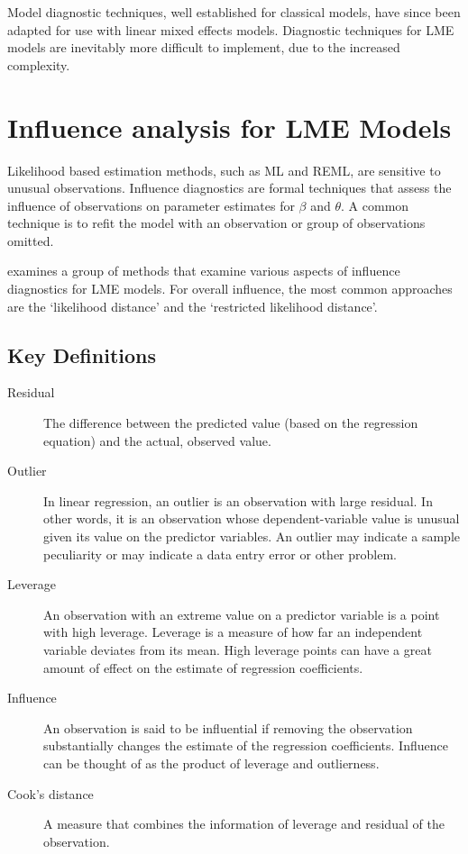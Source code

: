 \documentclass[12pt, a4paper]{article}
\begin{document}
			Model diagnostic techniques, well established for classical models, have since been adapted for use with linear mixed effects models. Diagnostic techniques for LME models are inevitably more difficult to implement, due to the increased complexity.
			
			\section{Influence analysis for LME Models} %
			
			Likelihood based estimation methods, such as ML and REML, are sensitive to unusual observations. Influence diagnostics are formal techniques that assess the influence of observations on parameter estimates for $\beta$ and $\theta$. A common technique is to refit the model with an observation or group of observations omitted.
			
			\citet{west} examines a group of methods that examine various aspects of influence diagnostics for LME models.
			For overall influence, the most common approaches are the `likelihood distance' and the `restricted likelihood distance'.	
			
			

\newpage
\subsection{Key Definitions}
\begin{description}
	\item[ Residual] The difference between the predicted value (based on the regression equation) and the actual, observed value.
	
	\item[ Outlier] In linear regression, an outlier is an observation with large residual. In other words, it is an observation whose dependent-variable value is unusual given its value on the predictor variables. An outlier may indicate a sample peculiarity or may indicate a data entry error or other problem.
	
	\item[ Leverage] An observation with an extreme value on a predictor variable is a point with high leverage. Leverage is a measure of how far an independent variable deviates from its mean. High leverage points can have a great amount of effect on the estimate of regression coefficients.
	
	\item[ Influence] An observation is said to be influential if removing the observation substantially changes the estimate of the regression coefficients.  Influence can be thought of as the product of leverage and outlierness.
	
	\item[ Cook's distance ] A measure that combines the information of leverage and residual of the observation.
\end{description}
\end{document}
